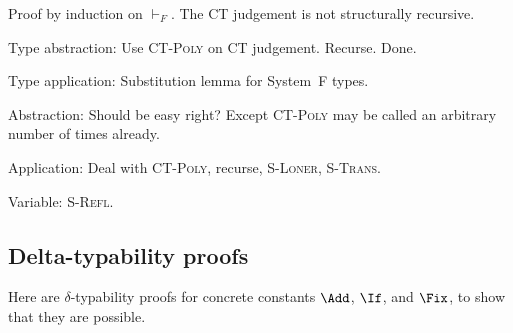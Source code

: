 \documentclass{amsart}
\theoremstyle{definition}
\begin{document}
Proof by induction on $\vdash_F$. The CT judgement is not
structurally recursive.

Type abstraction: Use \textsc{CT-Poly} on CT judgement. Recurse.
Done.

Type application: Substitution lemma for System~F types.

Abstraction: Should be easy right? Except \textsc{CT-Poly} may be
called an arbitrary number of times already.

Application: Deal with \textsc{CT-Poly}, recurse,
\textsc{S-Loner}, \textsc{S-Trans}.

Variable: \textsc{S-Refl}.

\subsection{Delta-typability proofs}
Here are $\delta$-typability proofs for concrete constants
$\Add$, $\If$, and $\Fix$, to show that they are possible.


\end{document}
